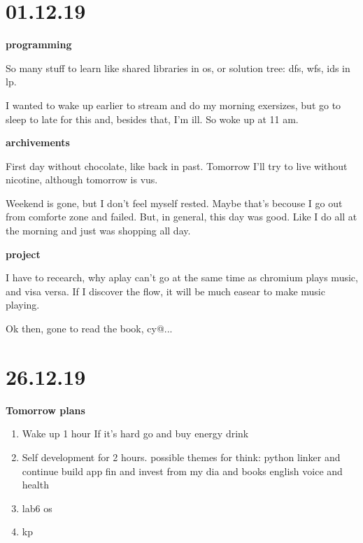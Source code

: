 \documentclass[12pt,a4paper,titlepage]{article}
\begin{document}
\newpage
\section{01.12.19}
\begin{center}
  \textbf{programming}
\end{center}
So many stuff to learn like shared libraries in os, or solution tree:
dfs, wfs, ids in lp.
\par I wanted to wake up earlier to stream and do my morning exersizes,
but go to sleep to late for this and, besides that, I'm ill. So woke up
at 11 am.

\begin{center}
  \textbf{archivements}
\end{center}
First day without chocolate, like back in past. Tomorrow I'll try to live
without nicotine, although tomorrow is vus.
\par Weekend is gone, but I don't feel myself rested. Maybe that's
becouse I go out from comforte zone and failed. But, in general, this
day was good. Like I do all at the morning and just was shopping all
day.

\begin{center}
  \textbf{project}
\end{center}
I have to recearch, why aplay can't go at the same time as chromium
plays music, and visa versa. If I discover the flow, it will be much
easear to make music playing.
\par Ok then, gone to read the book, cy@...

\newpage
\section{26.12.19}
\begin{center}
  \textbf{Tomorrow plans}
\end{center}
\begin{enumerate}
  \item Wake up 1 hour
    \subitem If it's hard go and buy energy drink
  \item Self development for 2 hours. possible themes for think:
    \subitem python linker and continue build app
    \subitem fin and invest from my dia and books
    \subitem english
    \subitem voice and health
  \item lab6 os
  \item kp
\end{enumerate}
\end{document}
